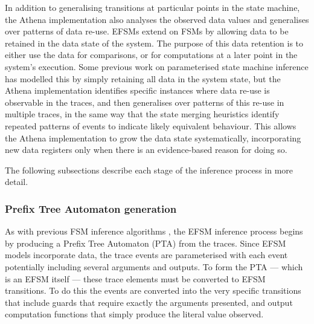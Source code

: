 In addition to generalising transitions at particular points in the state machine, the Athena implementation also analyses the observed data values and generalises over patterns of data re-use. EFSMs extend on FSMs by allowing data to be retained in the data state of the system. The purpose of this data retention is to either use the data for comparisons, or for computations at a later point in the system's execution. Some previous work on parameterised state machine inference has modelled this by simply retaining all data in the system state, but the Athena implementation identifies specific instances where data re-use is observable in the traces, and then generalises over patterns of this re-use in multiple traces, in the same way that the state merging heuristics identify repeated patterns of events to indicate likely equivalent behaviour. This allows the Athena implementation to grow the data state systematically, incorporating new data registers only when there is an evidence-based reason for doing so.

The following subsections describe each stage of the inference process in more detail.

\subsubsection{Prefix Tree Automaton generation}
\label{PTA}

As with previous FSM inference algorithms \cite{}, the EFSM inference process begins by producing a Prefix Tree Automaton (PTA) from the traces. Since EFSM models incorporate data, the trace events are parameterised with each event potentially including several arguments and outputs. To form the PTA --- which is an EFSM itself --- these trace elements must be converted to EFSM transitions. To do this the events are converted into the very specific transitions that include guards that require exactly the arguments presented, and output computation functions that simply produce the literal value observed.

